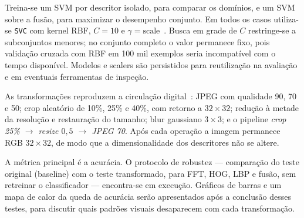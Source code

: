 \documentclass[12pt]{article}
\begin{document}
Treina-se um SVM por descritor isolado, para comparar os domínios, e um SVM sobre a fusão, para maximizar o desempenho conjunto. Em todos os casos utiliza-se \texttt{SVC} com kernel RBF, $C=10$ e $\gamma=\mathrm{scale}$~\cite{cortes1995svm}. Busca em grade de $C$ restringe-se a subconjuntos menores; no conjunto completo o valor permanece fixo, pois validação cruzada com RBF em 100 mil exemplos seria incompatível com o tempo disponível. Modelos e scalers são persistidos para reutilização na avaliação e em eventuais ferramentas de inspeção.

As transformações reproduzem a circulação digital~\cite{bammey2024synthbuster,choi2025warpad}: JPEG com qualidade 90, 70 e 50; crop aleatório de 10\%, 25\% e 40\%, com retorno a $32{\times}32$; redução à metade da resolução e restauração do tamanho; blur gaussiano $3{\times}3$; e o pipeline \emph{crop 25\% $\rightarrow$ resize $0{,}5$ $\rightarrow$ JPEG 70}. Após cada operação a imagem permanece RGB $32{\times}32$, de modo que a dimensionalidade dos descritores não se altere.

A métrica principal é a acurácia. O protocolo de robustez --- comparação do teste original (baseline) com o teste transformado, para FFT, HOG, LBP e fusão, sem retreinar o classificador --- encontra-se em execução. Gráficos de barras e um mapa de calor da queda de acurácia serão apresentados após a conclusão desses testes, para discutir quais padrões visuais desaparecem com cada transformação.



\end{document}
